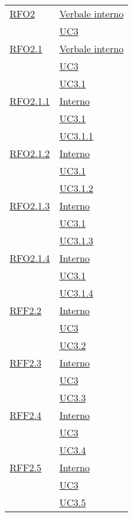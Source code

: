\begin{longtable}{|>{\centering}m{5cm}|m{5cm}<{\centering}|}
\hyperlink{RFO2}{RFO2} & \hyperlink{Verbale interno}{Verbale interno}\\
& \hyperref[UC3]{UC3}\\ \hline

\hyperlink{RFO2.1}{RFO2.1} & \hyperlink{Verbale interno}{Verbale interno}\\
& \hyperref[UC3]{UC3}\\
& \hyperref[UC3.1]{UC3.1}\\ \hline

\hyperlink{RFO2.1.1}{RFO2.1.1} & \hyperlink{Interno}{Interno}\\
& \hyperref[UC3.1]{UC3.1}\\
& \hyperref[UC3.1.1]{UC3.1.1}\\ \hline

\hyperlink{RFO2.1.2}{RFO2.1.2} & \hyperlink{Interno}{Interno}\\
& \hyperref[UC3.1]{UC3.1}\\
& \hyperref[UC3.1.2]{UC3.1.2}\\ \hline

\hyperlink{RFO2.1.3}{RFO2.1.3} & \hyperlink{Interno}{Interno}\\
& \hyperref[UC3.1]{UC3.1}\\
& \hyperref[UC3.1.3]{UC3.1.3}\\ \hline

\hyperlink{RFO2.1.4}{RFO2.1.4} & \hyperlink{Interno}{Interno}\\
& \hyperref[UC3.1]{UC3.1}\\
& \hyperref[UC3.1.4]{UC3.1.4}\\ \hline

\hyperlink{RFF2.2}{RFF2.2} & \hyperlink{Interno}{Interno}\\
& \hyperref[UC3]{UC3}\\
& \hyperref[UC3.2]{UC3.2}\\ \hline

\hyperlink{RFF2.3}{RFF2.3} & \hyperlink{Interno}{Interno}\\
& \hyperref[UC3]{UC3}\\
& \hyperref[UC3.3]{UC3.3}\\ \hline

\hyperlink{RFF2.4}{RFF2.4} & \hyperlink{Interno}{Interno}\\
& \hyperref[UC3]{UC3}\\
& \hyperref[UC3.4]{UC3.4}\\ \hline

\hyperlink{RFF2.5}{RFF2.5} & \hyperlink{Interno}{Interno}\\
& \hyperref[UC3]{UC3}\\
& \hyperref[UC3.5]{UC3.5}\\ \hline


\end{longtable}
